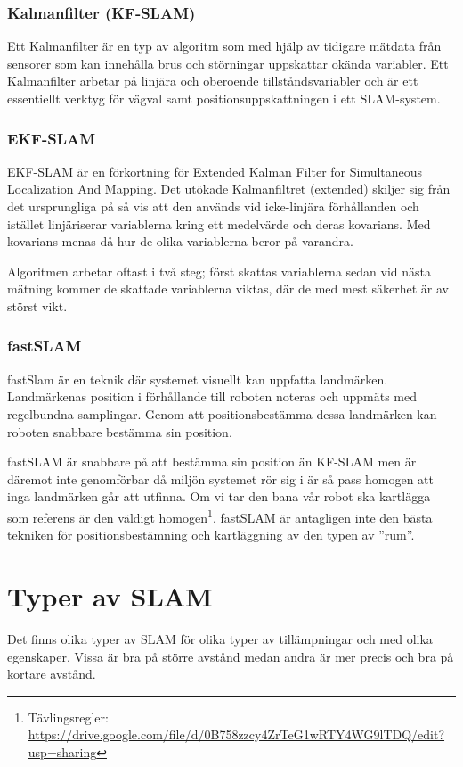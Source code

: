 \documentclass[a4paper,12pt,fleqn]{article}
\begin{document}
\subsubsection{Kalmanfilter (KF-SLAM)}
Ett Kalmanfilter är en typ av algoritm som med hjälp av tidigare mätdata från sensorer som kan innehålla brus och störningar uppskattar okända variabler. Ett Kalmanfilter arbetar på linjära och oberoende tillståndsvariabler och är ett essentiellt verktyg för vägval samt positionsuppskattningen i ett SLAM-system. 

\subsubsection{EKF-SLAM} 
EKF-SLAM är en förkortning för Extended Kalman Filter for Simultaneous Localization And Mapping. Det utökade Kalmanfiltret (extended) skiljer sig från det ursprungliga på så vis att den används vid icke-linjära förhållanden och istället linjäriserar variablerna kring ett medelvärde och deras kovarians. Med kovarians menas då hur de olika variablerna beror på varandra.

Algoritmen arbetar oftast i två steg; först skattas variablerna sedan vid nästa mätning 
kommer de skattade variablerna viktas, där de med mest säkerhet är av störst vikt.

\subsubsection{fastSLAM}
fastSlam är en teknik där systemet visuellt kan uppfatta landmärken. Landmärkenas position i förhållande till roboten noteras och uppmäts med regelbundna samplingar. Genom att positionsbestämma dessa landmärken kan roboten snabbare bestämma sin position. 

fastSLAM är snabbare på att bestämma sin position än KF-SLAM men är däremot inte genomförbar då miljön systemet rör sig i är så pass homogen att inga landmärken går att utfinna. Om vi tar den bana vår robot ska kartlägga som referens är den väldigt homogen\footnote{Tävlingsregler: \url{https://drive.google.com/file/d/0B758zzcy4ZrTeG1wRTY4WG9lTDQ/edit?usp=sharing}}. fastSLAM är antagligen inte den bästa tekniken för positionsbestämning och kartläggning av den typen av ''rum''. 


\section{Typer av SLAM}

Det finns olika typer av SLAM för olika typer av tillämpningar och med olika egenskaper. Vissa är bra på större avstånd medan andra är mer precis och bra på kortare avstånd. 
\end{document}
